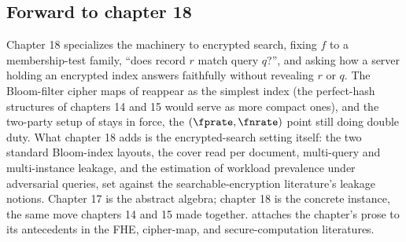 \subsection*{Forward to chapter 18}

Chapter 18 specializes the machinery to encrypted search, fixing $f$ to a
membership-test family, ``does record $r$ match query $q$?'', and asking
how a server holding an encrypted index answers faithfully without
revealing $r$ or $q$. The Bloom-filter cipher maps of
 reappear as the simplest index (the
perfect-hash structures of chapters 14 and 15 would serve as more
compact ones), and the two-party setup of
 stays in force, the $(\fprate, \fnrate)$
point still doing double duty. What chapter 18 adds is the encrypted-search setting itself: the two
standard Bloom-index layouts, the cover read per document, multi-query and
multi-instance leakage, and the estimation of workload prevalence under
adversarial queries, set against the searchable-encryption literature's
leakage notions. Chapter 17 is the
abstract algebra; chapter 18 is the concrete instance, the same move
chapters 14 and 15 made together.  attaches the
chapter's prose to its antecedents in the FHE, cipher-map, and
secure-computation literatures.
